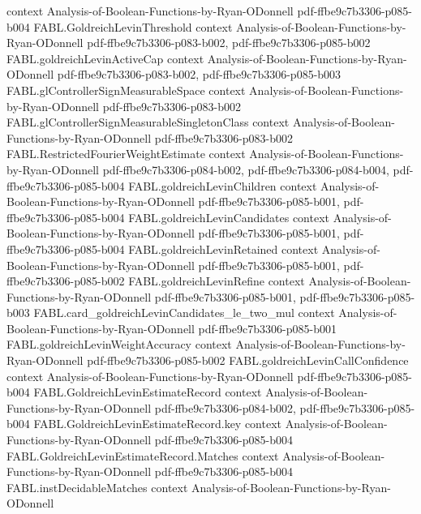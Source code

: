\begin{theorem}
  {context}
  {Analysis-of-Boolean-Functions-by-Ryan-ODonnell}
  {pdf-ffbe9c7b3306-p085-b004}
\proofstep
  {FABL.GoldreichLevinThreshold}
  {context}
  {Analysis-of-Boolean-Functions-by-Ryan-ODonnell}
  {pdf-ffbe9c7b3306-p083-b002,
    pdf-ffbe9c7b3306-p085-b002}
\proofstep
  {FABL.goldreichLevinActiveCap}
  {context}
  {Analysis-of-Boolean-Functions-by-Ryan-ODonnell}
  {pdf-ffbe9c7b3306-p083-b002,
    pdf-ffbe9c7b3306-p085-b003}
\proofstep
  {FABL.glControllerSignMeasurableSpace}
  {context}
  {Analysis-of-Boolean-Functions-by-Ryan-ODonnell}
  {pdf-ffbe9c7b3306-p083-b002}
\proofstep
  {FABL.glControllerSignMeasurableSingletonClass}
  {context}
  {Analysis-of-Boolean-Functions-by-Ryan-ODonnell}
  {pdf-ffbe9c7b3306-p083-b002}
\proofstep
  {FABL.RestrictedFourierWeightEstimate}
  {context}
  {Analysis-of-Boolean-Functions-by-Ryan-ODonnell}
  {pdf-ffbe9c7b3306-p084-b002,
    pdf-ffbe9c7b3306-p084-b004,
    pdf-ffbe9c7b3306-p085-b004}
\proofstep
  {FABL.goldreichLevinChildren}
  {context}
  {Analysis-of-Boolean-Functions-by-Ryan-ODonnell}
  {pdf-ffbe9c7b3306-p085-b001,
    pdf-ffbe9c7b3306-p085-b004}
\proofstep
  {FABL.goldreichLevinCandidates}
  {context}
  {Analysis-of-Boolean-Functions-by-Ryan-ODonnell}
  {pdf-ffbe9c7b3306-p085-b001,
    pdf-ffbe9c7b3306-p085-b004}
\proofstep
  {FABL.goldreichLevinRetained}
  {context}
  {Analysis-of-Boolean-Functions-by-Ryan-ODonnell}
  {pdf-ffbe9c7b3306-p085-b001,
    pdf-ffbe9c7b3306-p085-b002}
\proofstep
  {FABL.goldreichLevinRefine}
  {context}
  {Analysis-of-Boolean-Functions-by-Ryan-ODonnell}
  {pdf-ffbe9c7b3306-p085-b001,
    pdf-ffbe9c7b3306-p085-b003}
\proofstep
  {FABL.card_goldreichLevinCandidates_le_two_mul}
  {context}
  {Analysis-of-Boolean-Functions-by-Ryan-ODonnell}
  {pdf-ffbe9c7b3306-p085-b001}
\proofstep
  {FABL.goldreichLevinWeightAccuracy}
  {context}
  {Analysis-of-Boolean-Functions-by-Ryan-ODonnell}
  {pdf-ffbe9c7b3306-p085-b002}
\proofstep
  {FABL.goldreichLevinCallConfidence}
  {context}
  {Analysis-of-Boolean-Functions-by-Ryan-ODonnell}
  {pdf-ffbe9c7b3306-p085-b004}
\proofstep
  {FABL.GoldreichLevinEstimateRecord}
  {context}
  {Analysis-of-Boolean-Functions-by-Ryan-ODonnell}
  {pdf-ffbe9c7b3306-p084-b002,
    pdf-ffbe9c7b3306-p085-b004}
\proofstep
  {FABL.GoldreichLevinEstimateRecord.key}
  {context}
  {Analysis-of-Boolean-Functions-by-Ryan-ODonnell}
  {pdf-ffbe9c7b3306-p085-b004}
\proofstep
  {FABL.GoldreichLevinEstimateRecord.Matches}
  {context}
  {Analysis-of-Boolean-Functions-by-Ryan-ODonnell}
  {pdf-ffbe9c7b3306-p085-b004}
\proofstep
  {FABL.instDecidableMatches}
  {context}
  {Analysis-of-Boolean-Functions-by-Ryan-ODonnell}

\end{theorem}
